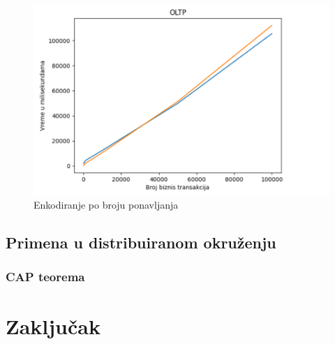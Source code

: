 \documentclass[12pt,oneside]{memoir}
\begin{document}
\begin{figure}[!ht]
  \centering
  \includegraphics[width=1\textwidth]{oltp-vizualization.png}
  \caption{Enkodiranje po broju ponavljanja}
  \label{fig:grafikon}
\end{figure}

\section{Primena u distribuiranom okruženju}
\subsection{CAP teorema}

\chapter{Zaključak}

\literatura

\backmatter
\end{document}
